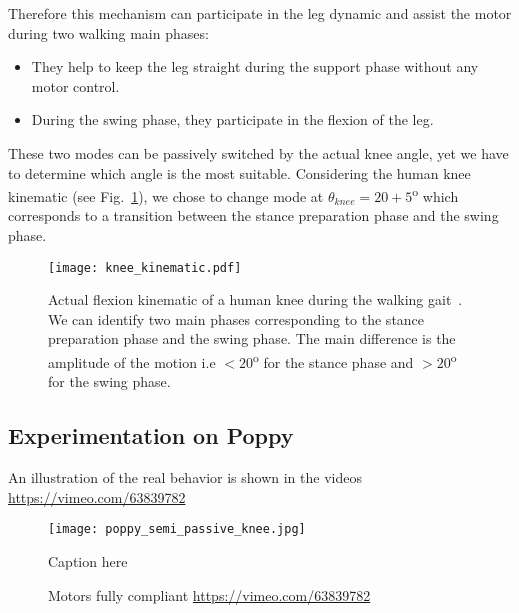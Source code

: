 Therefore this mechanism can participate in the leg dynamic and assist the motor during two walking main phases:
\begin{itemize}
    \item They help to keep the leg straight during the support phase without any motor control.
    \item During the swing phase, they participate in the flexion of the leg.
\end{itemize}

These two modes can be passively switched by the actual knee angle, yet we have to determine which angle is the most suitable. Considering the human knee kinematic (see Fig.~\ref{fig:human_knee_kinematic}), we chose to change mode at $\theta_{knee} = 20+5$\textsuperscript{o}  which corresponds to a transition between the stance preparation phase and the swing phase.

\begin{figure}[thpb]
    \centering
    \texttt{[image: knee\_kinematic.pdf]}
    \caption{Actual flexion kinematic of a human knee during the walking gait~\parencite{Nester2003}. We can identify two main phases corresponding to the stance preparation phase and the swing phase. The main difference is the amplitude of the motion i.e $<20$\textsuperscript{o}  for the stance phase and $>20$\textsuperscript{o} for the swing phase.}
    \label{fig:human_knee_kinematic}
\end{figure}


\subsection{Experimentation on Poppy} %

An illustration of the real behavior is shown in the videos \url{https://vimeo.com/63839782}

\begin{figure}[h]
    \begin{center}
        \texttt{[image: poppy\_semi\_passive\_knee.jpg]}
    \end{center}
    \caption{Caption here}
    \label{fig:figure1}
\end{figure}


\begin{figure}[!h]
\centering
    \hfil
    \caption{Motors fully compliant \url{https://vimeo.com/63839782}}
    \label{fig:}
\end{figure}




